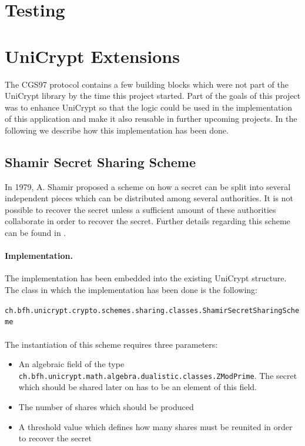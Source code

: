 \documentclass[numbers=noenddot, abstract=on, a4paper, headsepline,
footsepline, oneside, draft=off]{scrreprt}
\begin{document}
\section{Testing}
\label{sec:testing}

\section{UniCrypt Extensions}
\label{sec:enhancmentsunicrypt}
The CGS97 protocol contains a few building blocks which were not part of the
UniCrypt library by the time this project started. Part of the goals of this
project was to enhance UniCrypt so that the logic could be used in the
implementation of this application and make it also reusable in further upcoming
projects. In the following we describe how this implementation has been done.

\subsection{Shamir Secret Sharing Scheme}
In 1979, A. Shamir proposed a scheme \cite{Shamir79} on how a secret can be
split into several independent pieces which can be distributed among several
authorities. It is not possible to recover the secret unless a sufficient amount
of these authorities collaborate in order to recover the secret. Further details
regarding this scheme can be found in .

\paragraph{Implementation.} The implementation has been embedded into the
existing UniCrypt structure.
The class in which the implementation has been done is the following:

\texttt{ch.bfh.unicrypt.crypto.schemes.sharing.classes.ShamirSecretSharingScheme}
\\
\\
The instantiation of this scheme requires three parameters:
\begin{itemize}
  \item An algebraic field of the type \\
  \texttt{ch.bfh.unicrypt.math.algebra.dualistic.classes.ZModPrime}. The secret
  which should be shared later on has to be an element of this field.
  \item The number of shares which should be produced
  \item A threshold value which defines how many shares must be reunited in
  order to recover the secret
\end{itemize}
\end{document}
